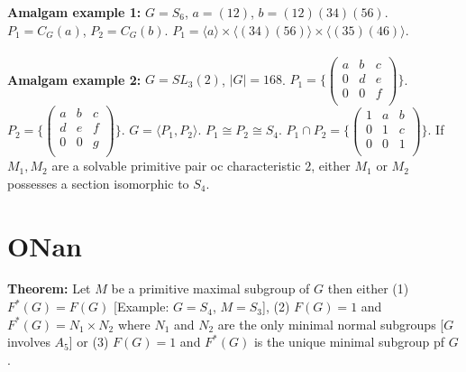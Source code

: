 {\bf Amalgam example 1:} $G= S_6$, $a=(12)$, $b=(12)(34)(56)$.  $P_1 = C_G(a)$, $P_2 = C_G(b)$.  $P_1 = \langle a \rangle \times \langle (34)(56) \rangle \times \langle (35)(46) \rangle$.
\\
\\
{\bf Amalgam example 2:} $G= SL_3(2)$, $|G|=168$.
$P_1 = \{\left(
\begin{array}{ccc}
a & b & c \\
0 & d & e \\
0 & 0 & f \\
\end{array}
\right) \}$.
$P_2 = \{\left(
\begin{array}{ccc}
a & b & c \\
d & e & f \\
0 & 0 & g \\
\end{array}
\right) \}$. $G=\langle P_1, P_2\rangle$. $P_1 \cong P_2 \cong S_4$.
$P_1 \cap P_2 = \{\left(
\begin{array}{ccc}
1 & a & b \\
0 & 1 & c \\
0 & 0 & 1 \\
\end{array}
\right) \}$.  If $M_1, M_2$ are a solvable primitive pair oc characteristic $2$, either $M_1$ or $M_2$ possesses a section isomorphic
to $S_4$.
\section {ONan}
{\bf Theorem:} Let $M$ be a primitive maximal subgroup of $G$ then either (1) $F^*(G)=F(G)$ [Example: $G=S_4$, $M=S_3$], (2)
$F(G)= 1$ and $F^*(G) = N_1 \times N_2$ where $N_1$ and $N_2$ are the only minimal normal subgroups
[$G$ involves $A_5$] or (3) $F(G)=1$ and $F^*(G)$ is the unique minimal subgroup pf $G$.

